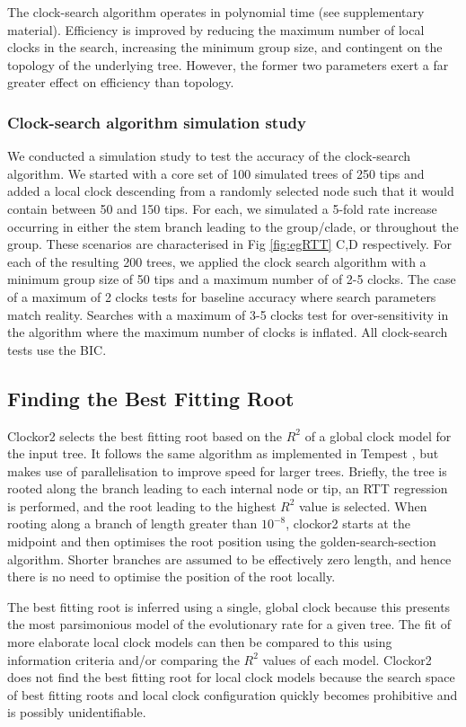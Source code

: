 \documentclass{article}
\begin{document}
The clock-search algorithm operates in polynomial time (see supplementary material). Efficiency is improved by reducing the maximum number of local clocks in the search, increasing the minimum group size, and contingent on the topology of the underlying tree. However, the former two parameters exert a far greater effect on efficiency than topology.

\subsubsection*{Clock-search algorithm simulation study}
We conducted a simulation study to test the accuracy of the clock-search algorithm. We started with a core set of 100 simulated trees of 250 tips and added a local clock descending from a randomly selected node such that it would contain between 50 and 150 tips. For each, we simulated a 5-fold rate increase occurring in either the stem branch leading to the group/clade, or throughout the group. These scenarios are characterised in  Fig \ref{fig:egRTT} C,D respectively. For each of the resulting 200 trees, we applied the clock search algorithm with a minimum group size of 50 tips and a maximum number of of 2-5 clocks. The case of a maximum of 2 clocks tests for baseline accuracy where search parameters match reality. Searches with a maximum of 3-5 clocks test for over-sensitivity in the algorithm where the maximum number of clocks is inflated. All clock-search tests use the BIC.

\subsection*{Finding the Best Fitting Root}
Clockor2 selects the best fitting root based on the $R^2$ of a global clock model for the input tree. It follows the same algorithm as implemented in Tempest \citet{rambaut_exploring_2016}, but makes use of parallelisation to improve speed for larger trees. Briefly, the tree is rooted along the branch leading to each internal node or tip, an RTT regression is performed, and the root leading to the highest $R^2$ value is selected. When rooting along a branch of length greater than $10^{-8}$, clockor2 starts at the midpoint and then optimises the root position using the golden-search-section algorithm. Shorter branches are assumed to be effectively zero length, and hence there is no need to optimise the position of the root locally.

The best fitting root is inferred using a single, global clock because this presents the most parsimonious model of the evolutionary rate for a given tree. The fit of more elaborate local clock models can then be compared to this using information criteria and/or comparing the $R^2$ values of each model. Clockor2 does not find the best fitting root for local clock models because the search space of best fitting roots and local clock configuration quickly becomes prohibitive and is possibly unidentifiable.
\end{document}
